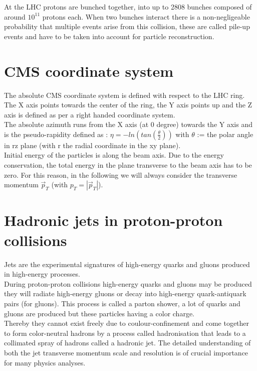 At the LHC protons are bunched together, into up to 2808 bunches composed of around $10^{11}$ protons each.
When two bunches interact there is a non-negligeable probability that multiple events arise from this collision, these
are called pile-up events and have to be taken into account for particle reconstruction.

\section{CMS coordinate system}

The absolute CMS coordinate system is defined with respect to the LHC ring. The X axis points towards the center
of the ring, the Y axis points up and the Z axis is defined as per a right handed coordinate system. \\
The absolute azimuth \textphi runs from the X axis (at 0 degree) towards the Y axis and \texteta is the pseudo-rapidity
defined as : $\eta = -ln(tan(\frac{\theta}{2}))$ with $\theta$ := the polar angle in rz plane (with r the radial
coordinate in the xy plane).\\
Initial energy of the particles is along the beam axis. Due to the energy conservation, the total energy in the plane
transverse to the beam axis has to be zero. For this reason, in the following we will always consider the transverse
momentum $\vec{p}_{T}$ (with $p_{T} = |\vec{p}_{T}|$).


\section{Hadronic jets in proton-proton collisions}

Jets are the experimental signatures of high-energy quarks and gluons produced in high-energy processes.\\
During proton-proton collisions high-energy quarks and gluons may be produced they will radiate high-energy gluons or
decay into high-energy quark-antiquark pairs (for gluons). This process is called a parton shower, a lot of quarks and
gluons are produced but these particles having a color charge.\\
Thereby they cannot exist freely due to coulour-confinement and come together to form color-neutral hadrons by a process called
hadronisation that leads to a collimated spray of hadrons called a hadronic jet.
The detailed understanding of both the jet transverse momentum scale and resolution is of crucial importance for many physics analyses.


